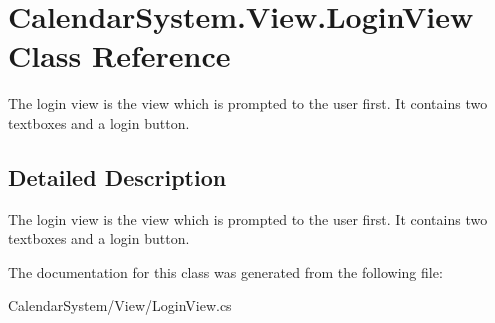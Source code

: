 \hypertarget{class_calendar_system_1_1_view_1_1_login_view}{\section{Calendar\+System.\+View.\+Login\+View Class Reference}
\label{class_calendar_system_1_1_view_1_1_login_view}
}


The login view is the view which is prompted to the user first. It contains two textboxes and a login button.  




\subsection{Detailed Description}
The login view is the view which is prompted to the user first. It contains two textboxes and a login button. 



The documentation for this class was generated from the following file\+:\begin{DoxyCompactItemize}
\item 
Calendar\+System/\+View/Login\+View.\+cs\end{DoxyCompactItemize}
